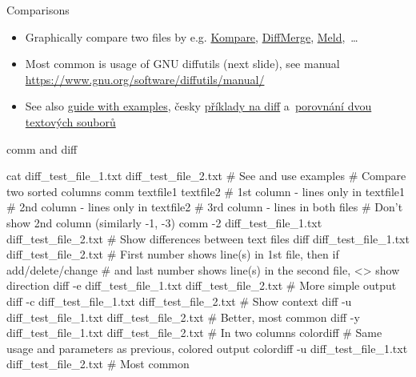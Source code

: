 \documentclass[compress, ucs, xelatex, 11pt, xcolor=svgnames, aspectratio=169,
	hyperref={
		bookmarks=true,
		unicode=true,
		colorlinks=true,
		pdftitle={Linux, command line and MetaCentrum},
		plainpages=false,
		pdfauthor={Vojtech Zeisek},
		pdfsubject={Course about use of Linux command line, writing shell scripts and using MetaCentrum of CESNET},
		pdfcreator={XeLaTeX},
		pdfkeywords={Linux, GNU, BASH, shell, command line, MetaCentrum},
		linkcolor=DarkRed, %
		anchorcolor=DarkBlue, %
		citecolor=Indigo, %
		filecolor=NavyBlue, %
		menucolor=DarkMagenta, %
		urlcolor=DarkBlue, %
		pdftex},
	url={hyphens, lowtilde} %
	]{beamer}
\renewcommand{\texttt}[1]{\hl{\ttfamily #1}}
\begin{document}
\begin{frame}{Comparisons}
	\begin{itemize}
		\item Graphically compare two files by e.g. \href{https://kde.org/applications/development/org.kde.kompare}{Kompare}, \href{https://sourcegear.com/diffmerge/}{DiffMerge}, \href{https://meldmerge.org/}{Meld},~\ldots
		\item Most common is usage of GNU diffutils (next slide), see manual \url{https://www.gnu.org/software/diffutils/manual/}
		\item See also \href{https://www.computerhope.com/unix/udiff.htm}{guide with examples}, česky \href{https://blog.root.cz/petrkrcmar/diff-jak-cist-vystup-z-porovnani-souboru/}{příklady na diff} a~\href{https://www.root.cz/clanky/nastroje-pro-porovnani-obsahu-dvou-textovych-souboru/}{porovnání dvou textových souborů}
	\end{itemize}
	\begin{center}
		\texttt{[image: kompare.png]}
	\end{center}
\end{frame}

\begin{frame}[fragile]{comm and diff}
	\begin{bashcode}
    cat diff_test_file_1.txt diff_test_file_2.txt # See and use examples
    # Compare two sorted columns
    comm textfile1 textfile2
      # 1st column - lines only in textfile1
      # 2nd column - lines only in textfile2
      # 3rd column - lines in both files
    # Don't show 2nd column (similarly -1, -3)
    comm -2 diff_test_file_1.txt diff_test_file_2.txt
    # Show differences between text files
    diff diff_test_file_1.txt diff_test_file_2.txt
      # First number shows line(s) in 1st file, then if add/delete/change
      # and last number shows line(s) in the second file, <> show direction
    diff -e diff_test_file_1.txt diff_test_file_2.txt # More simple output
    diff -c diff_test_file_1.txt diff_test_file_2.txt # Show context
    diff -u diff_test_file_1.txt diff_test_file_2.txt # Better, most common
    diff -y diff_test_file_1.txt diff_test_file_2.txt # In two columns
    colordiff # Same usage and parameters as previous, colored output
    colordiff -u diff_test_file_1.txt diff_test_file_2.txt # Most common
	\end{bashcode}
\end{frame}
\end{document}
